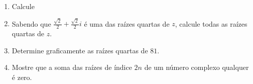 \documentclass[a4paper,5pt]{amsbook}
\begin{document}
\begin{enumerate}
	\vspace{0.5cm}
	\item Calcule


	\vspace{0.5cm}
	\item Sabendo que $\displaystyle\frac{\sqrt{2}}{2} + \frac{\sqrt{2}}{2}i$ é uma das raízes quartas de $z$, calcule todas as raízes quartas de $z$.

	\vspace{0.5cm}
	\item Determine graficamente as raízes quartas de $81$.

	\vspace{0.5cm}
	\item Mostre que a soma das raízes de índice $2n$ de um número complexo qualquer é zero.
\end{enumerate}
\end{document}
